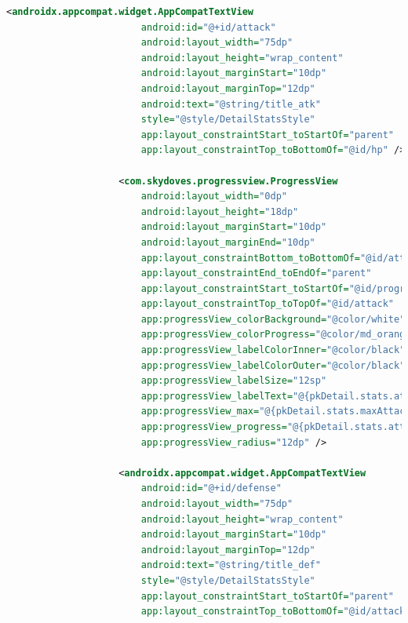 \documentclass[a4paper, 12pt]{article}
\begin{document}
\begin{lstlisting}[caption={Pokemon Detail Layout.}, label={layout:pk_detail}, language=XML]
                    <androidx.appcompat.widget.AppCompatTextView
                        android:id="@+id/attack"
                        android:layout_width="75dp"
                        android:layout_height="wrap_content"
                        android:layout_marginStart="10dp"
                        android:layout_marginTop="12dp"
                        android:text="@string/title_atk"
                        style="@style/DetailStatsStyle"
                        app:layout_constraintStart_toStartOf="parent"
                        app:layout_constraintTop_toBottomOf="@id/hp" />
    
                    <com.skydoves.progressview.ProgressView
                        android:layout_width="0dp"
                        android:layout_height="18dp"
                        android:layout_marginStart="10dp"
                        android:layout_marginEnd="10dp"
                        app:layout_constraintBottom_toBottomOf="@id/attack"
                        app:layout_constraintEnd_toEndOf="parent"
                        app:layout_constraintStart_toStartOf="@id/progress_hp"
                        app:layout_constraintTop_toTopOf="@id/attack"
                        app:progressView_colorBackground="@color/white"
                        app:progressView_colorProgress="@color/md_orange_100"
                        app:progressView_labelColorInner="@color/black"
                        app:progressView_labelColorOuter="@color/black"
                        app:progressView_labelSize="12sp"
                        app:progressView_labelText="@{pkDetail.stats.attack}"
                        app:progressView_max="@{pkDetail.stats.maxAttack}"
                        app:progressView_progress="@{pkDetail.stats.attack}"
                        app:progressView_radius="12dp" />
    
                    <androidx.appcompat.widget.AppCompatTextView
                        android:id="@+id/defense"
                        android:layout_width="75dp"
                        android:layout_height="wrap_content"
                        android:layout_marginStart="10dp"
                        android:layout_marginTop="12dp"
                        android:text="@string/title_def"
                        style="@style/DetailStatsStyle"
                        app:layout_constraintStart_toStartOf="parent"
                        app:layout_constraintTop_toBottomOf="@id/attack" />
    

\end{lstlisting}
\end{document}
